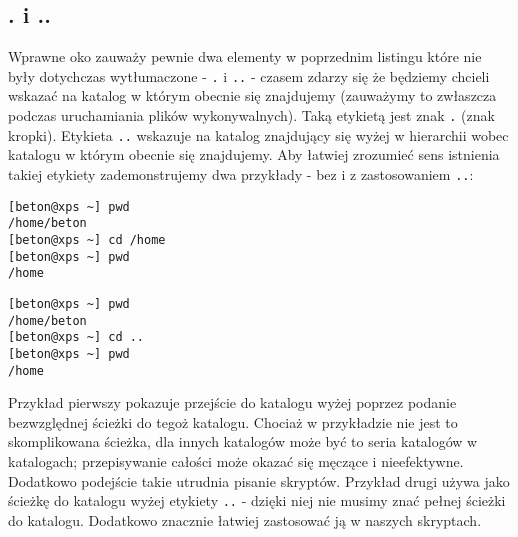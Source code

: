 \documentclass[10 pt, a4paper, draft]{report}
\begin{document}
\subsection{. i ..}
Wprawne oko zauważy pewnie dwa elementy w poprzednim listingu które nie były dotychczas wytłumaczone - \texttt{.} i \texttt{..} - czasem zdarzy się że będziemy chcieli wskazać na katalog w którym obecnie się znajdujemy (zauważymy to zwłaszcza podczas uruchamiania plików wykonywalnych). Taką etykietą jest znak \texttt{.} (znak kropki).
\newline
\newline
Etykieta \texttt{..} wskazuje na katalog znajdujący się wyżej w hierarchii wobec katalogu w którym obecnie się znajdujemy. Aby łatwiej zrozumieć sens istnienia takiej etykiety zademonstrujemy dwa przykłady - bez i z zastosowaniem \texttt{..}:
\newline
\begin{verbatim}
[beton@xps ~] pwd
/home/beton
[beton@xps ~] cd /home
[beton@xps ~] pwd
/home
\end{verbatim}
\begin{verbatim}
[beton@xps ~] pwd
/home/beton
[beton@xps ~] cd ..
[beton@xps ~] pwd
/home
\end{verbatim}
Przykład pierwszy pokazuje przejście do katalogu wyżej poprzez podanie bezwzględnej ścieżki do tegoż katalogu. Chociaż w przykładzie nie jest to skomplikowana ścieżka, dla innych katalogów może być to seria katalogów w katalogach; przepisywanie całości może okazać się męczące i nieefektywne. Dodatkowo podejście takie utrudnia pisanie skryptów.
\newline
\newline
Przykład drugi używa jako ścieżkę do katalogu wyżej etykiety \texttt{..} - dzięki niej nie musimy znać pełnej ścieżki do katalogu. Dodatkowo znacznie łatwiej zastosować ją w naszych skryptach.
\end{document}
